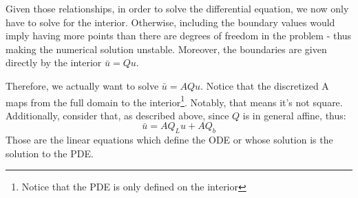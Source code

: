 \documentclass[11pt]{article}
\begin{document}
\begin{itemize}
			Given those relationships, in order to solve the differential equation, we now only have to solve for the interior. Otherwise, including the boundary values would imply having more points than there are degrees of freedom in the problem - thus making the numerical solution unstable. Moreover, the boundaries are given directly by the interior $\bar{u} = Q u$.

			Therefore, we actually want to solve $\bar{u} = A Q u$. Notice that the discretized A maps from the full domain to the interior\footnote{Notice that the PDE is only defined on the interior}. Notably, that means it's not square. Additionally, consider that, as described above, since $Q$ is in general affine, thus:
			\begin{equation}
			\bar{u} = A Q_L u + A Q_b
			\end{equation}
			Those are the linear equations which define the ODE or whose solution is the solution to the PDE.
		\end{itemize}
\end{document}
